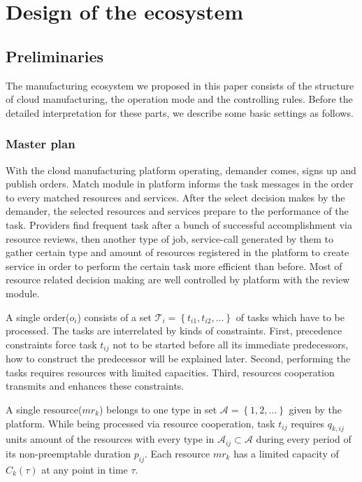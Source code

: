 \section{Design of the ecosystem} %
\label{sec:design_of_the_ecosystem}
\subsection{Preliminaries} %
\label{sub:preliminaries}
The manufacturing ecosystem we proposed in this paper consists of the structure of cloud manufacturing, the operation mode and the controlling rules. Before the detailed interpretation for these parts, we describe some basic settings as follows.

\subsubsection{Master plan} %
\label{ssub:master_plam}
With the cloud manufacturing platform operating, demander comes, signs up and publish orders. Match module in platform informs the task messages in the order to every matched resources and services. After the select decision makes by the demander, the selected resources and services prepare to the performance of the task.
Providers find frequent task after a bunch of successful accomplishment via resource reviews, then another type of job, service-call generated by them to gather certain type and amount of resources registered in the platform to create service in order to perform the certain task more efficient than before. Most of resource related decision making are well controlled by platform with the review module.

A single order($o_i$) consists of a set $\mathcal{T}_i = \left\{ t_{i1},t_{i2},\dots\right\}$ of tasks which have to be processed. The tasks are interrelated by kinds of constraints. First, precedence constraints force task $t_{ij}$ not to be started before all its immediate predecessors, how to construct the predecessor will be explained later. Second, performing the tasks requires resources with limited capacities. Third, resources cooperation transmits and enhances these constraints.

A single resource($mr_k$) belongs to one type in set $\mathcal{A} = \left\{1,2,\dots\right\}$ given by the platform. While being processed via resource cooperation, task $t_{ij}$ requires $q_{k,ij}$ units amount of the resources with every type in $\mathcal{A}_{ij}\subset\mathcal{A}$ during every period of its non-preemptable duration $p_{ij}$. Each resource $mr_k$ has a limited capacity of $C_k(\tau)$ at any point in time $\tau$.

